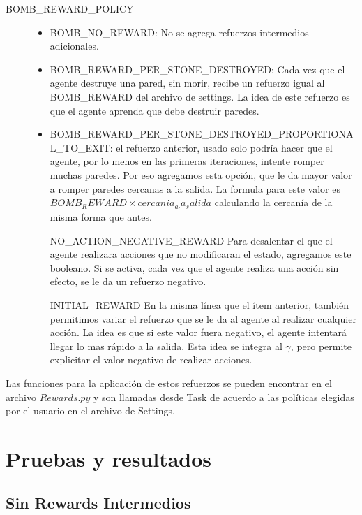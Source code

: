 \documentclass[a4paper,spanish] {article}
\begin{document}
\begin{description}
\item[BOMB_REWARD_POLICY] 
	\begin{itemize}
	\item BOMB_NO_REWARD: No se agrega refuerzos intermedios adicionales.
	\item BOMB_REWARD_PER_STONE_DESTROYED: Cada vez que el agente destruye una pared, sin morir, recibe un refuerzo igual al BOMB_REWARD del archivo de settings. La idea de este refuerzo es que el agente aprenda que debe destruir paredes.
	\item BOMB_REWARD_PER_STONE_DESTROYED_PROPORTIONAL_TO_EXIT: el refuerzo anterior, usado solo podría hacer que el agente, por lo menos en las primeras iteraciones, intente romper muchas paredes. Por eso agregamos esta opción, que le da mayor valor a romper paredes cercanas a la salida. La formula para este valor es $BOMB_REWARD \times cercania_a_la_salida$ calculando la cercanía de la misma forma que antes.
	
\item[NO_ACTION_NEGATIVE_REWARD] Para desalentar el que el agente realizara acciones que no modificaran el estado, agregamos este booleano. Si se activa, cada vez que el agente realiza una acción sin efecto, se le da un refuerzo negativo. 

\item[INITIAL_REWARD] En la misma línea que el ítem anterior, también permitimos variar el refuerzo que se le da al agente al realizar cualquier acción. La idea es que si este valor fuera negativo, el agente intentará llegar lo mas rápido a la salida. Esta idea se integra al $\gamma$, pero permite explicitar el valor negativo de realizar acciones.

	\end{itemize}

	


\end{description}

	Las funciones para la aplicación de estos refuerzos se pueden encontrar en el archivo $Rewards.py$ y son llamadas desde Task de acuerdo a las políticas elegidas por el usuario en el archivo de Settings.
 
	



\section{Pruebas y resultados}
	\subsection{Sin Rewards Intermedios}
\end{document}
